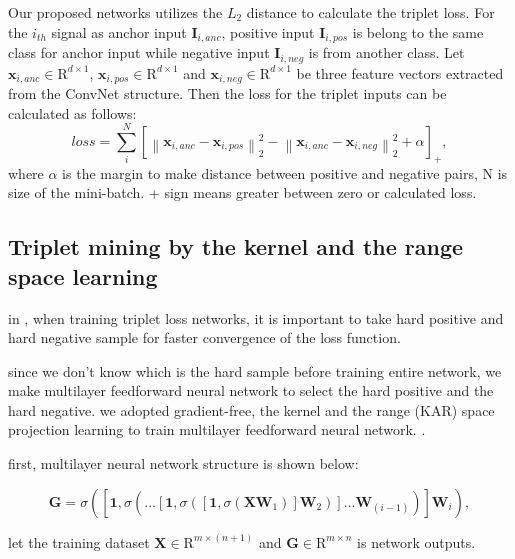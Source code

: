 \documentclass[runningheads]{llncs}
\begin{document}
Our proposed networks utilizes the $L_2$ distance to calculate the triplet loss. For the $i_{th}$ signal as anchor input $\mathbf{I}_{i,anc}$, positive input $\mathbf{I}_{i,pos}$ is belong to the same class for anchor input while negative input $\mathbf{I}_{i,neg}$ is from another class.
Let $\mathbf{x}_{i,anc}\in{\mathrm{R}}^{d\times1}$, $\mathbf{x}_{i,pos}\in{\mathrm{R}}^{d\times1}$ and $\mathbf{x}_{i,neg}\in{\mathrm{R}}^{d\times1}$ be three feature vectors extracted from the ConvNet structure. Then the loss for the triplet inputs can be calculated as follows:
\begin{equation}
loss = \sum_i^N { \left[ {\left\| {{\mathbf{x}_{i,anc}} - {\mathbf{x}_{i,pos}}} \right\|_2^2} -
{\left\| {{\mathbf{x}_{i,anc}} - {\mathbf{x}_{i,neg}}} \right\|_2^2}  + \alpha \right]_+},
\end{equation} 
where $\alpha$ is the margin to make distance between positive and negative pairs, N is size of the mini-batch.
+ sign means greater between zero or calculated loss.


\subsection{Triplet mining by the kernel and the range space learning}

in \cite{schroff2015facenet}, when training triplet loss networks, it is important to take hard positive and hard negative sample for faster convergence of the loss function.

since we don't know which is the hard sample before training entire network, we make multilayer feedforward neural network to select the hard positive and the hard negative.
we adopted gradient-free, the kernel and the range (KAR) space projection learning to train multilayer feedforward neural network. \cite{toh2018learning,toh2018gradient}.

first, multilayer neural network structure is shown below:

\begin{equation}
\mathbf{G} = \sigma\left(\left[\mathbf{1},\sigma\left(\dots\left[\mathbf{1},\sigma\left(\left[\mathbf{1},\sigma\left(\mathbf{X}\mathbf{W}_{1}\right)\right]\mathbf{W}_{2}\right)\right]\dots\mathbf{W}_{(i-1)}\right)\right]\mathbf{W}_{i}\right),
\end{equation}

let the training dataset $\mathbf{X}\in{\mathrm{R}}^{m \times (n+1)}$ and $\mathbf{G}\in{\mathrm{R}}^{m \times n}$ is network outputs.
\end{document}

